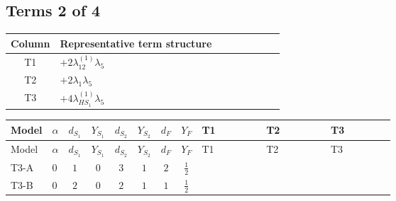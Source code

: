 \documentclass[8pt]{article}
\begin{document}
\begin{landscape}
\subsection*{Terms 2 of 4}
\begin{center}
\begin{tabular}{@{}c >{\raggedright\arraybackslash}p{0.82\linewidth}@{}}
\toprule
Column & Representative term structure \\
\midrule
T1 & \(\displaystyle +2 {\lambda_{12}^{(1)}} {\lambda_5}\) \\
\midrule
T2 & \(\displaystyle +2 {\lambda_1} {\lambda_5}\) \\
\midrule
T3 & \(\displaystyle +4 {\lambda_{HS_1}^{(1)}} {\lambda_5}\) \\
\midrule
\bottomrule
\end{tabular}
\end{center}
\smallskip
\tiny
\begin{longtable}{@{}llcccccc >{\raggedright\arraybackslash}p{0.21\linewidth} >{\raggedright\arraybackslash}p{0.21\linewidth} >{\raggedright\arraybackslash}p{0.21\linewidth}@{}}
\toprule
Model & $\alpha$ & $d_{S_1}$ & $Y_{S_1}$ & $d_{S_2}$ & $Y_{S_2}$ & $d_F$ & $Y_F$ & T1 & T2 & T3 \\
\midrule
\endfirsthead
\toprule
Model & $\alpha$ & $d_{S_1}$ & $Y_{S_1}$ & $d_{S_2}$ & $Y_{S_2}$ & $d_F$ & $Y_F$ & T1 & T2 & T3 \\
\midrule
\endhead
T3-A & $0$ & $1$ & $0$ & $3$ & $1$ & $2$ & $\frac{1}{2}$ & \scriptsize\adjustbox{max width=\linewidth}{$\begin{gathered} +2 {\lambda_{12}^{(1)}} {\lambda_5}\end{gathered}$} & \scriptsize\adjustbox{max width=\linewidth}{$\begin{gathered} +2 {\lambda_1} {\lambda_5}\end{gathered}$} & \scriptsize\adjustbox{max width=\linewidth}{$\begin{gathered} +4 {\lambda_{HS_1}^{(1)}} {\lambda_5}\end{gathered}$} \\
\midrule
T3-B & $0$ & $2$ & $0$ & $2$ & $1$ & $1$ & $\frac{1}{2}$ & \scriptsize\adjustbox{max width=\linewidth}{$\begin{gathered} +2 {\lambda_{12}^{(1)}} {\lambda_5}\end{gathered}$} & \scriptsize\adjustbox{max width=\linewidth}{$\begin{gathered} +2 {\lambda_1} {\lambda_5}\end{gathered}$} & \scriptsize\adjustbox{max width=\linewidth}{$\begin{gathered} +4 {\lambda_{HS_1}^{(1)}} {\lambda_5}\end{gathered}$} \\

\end{longtable}
\end{landscape}
\end{document}
